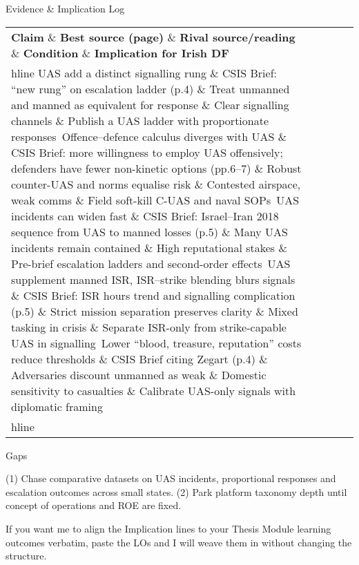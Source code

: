 Evidence \& Implication Log

 

\begin{tabular}{p{3.2cm}p{4.2cm}p{3.6cm}p{3.2cm}p{4.2cm}}
	\textbf{Claim} \& \textbf{Best source (page)} \& \textbf{Rival source/reading} \& \textbf{Condition} \& \textbf{Implication for Irish DF}\\hline
	UAS add a distinct signalling rung \& CSIS Brief: “new rung” on escalation ladder (p.4) \& Treat unmanned and manned as equivalent for response \& Clear signalling channels \& Publish a UAS ladder with proportionate responses\
	Offence–defence calculus diverges with UAS \& CSIS Brief: more willingness to employ UAS offensively; defenders have fewer non-kinetic options (pp.6–7) \& Robust counter-UAS and norms equalise risk \& Contested airspace, weak comms \& Field soft-kill C-UAS and naval SOPs\
	UAS incidents can widen fast \& CSIS Brief: Israel–Iran 2018 sequence from UAS to manned losses (p.5) \& Many UAS incidents remain contained \& High reputational stakes \& Pre-brief escalation ladders and second-order effects\
	UAS supplement manned ISR, ISR–strike blending blurs signals \& CSIS Brief: ISR hours trend and signalling complication (p.5) \& Strict mission separation preserves clarity \& Mixed tasking in crisis \& Separate ISR-only from strike-capable UAS in signalling\
	Lower “blood, treasure, reputation” costs reduce thresholds \& CSIS Brief citing Zegart (p.4) \& Adversaries discount unmanned as weak \& Domestic sensitivity to casualties \& Calibrate UAS-only signals with diplomatic framing\\hline
\end{tabular}

Gaps

(1) Chase comparative datasets on UAS incidents, proportional responses and escalation outcomes across small states.
(2) Park platform taxonomy depth until concept of operations and ROE are fixed.

If you want me to align the Implication lines to your Thesis Module learning outcomes verbatim, paste the LOs and I will weave them in without changing the structure.

\parencite{UAS_Roadmap_2005}

